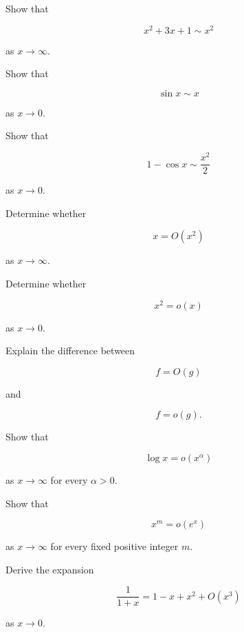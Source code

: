 \begin{exercise}[1]
Show that

\[
x^2+3x+1\sim x^2
\]

as \(x\to\infty\).
\end{exercise}

\begin{exercise}[1]
Show that

\[
\sin x\sim x
\]

as \(x\to0\).
\end{exercise}

\begin{exercise}[1]
Show that

\[
1-\cos x
\sim
\frac{x^2}{2}
\]

as \(x\to0\).
\end{exercise}

\begin{exercise}[1]
Determine whether

\[
x=O(x^2)
\]

as \(x\to\infty\).
\end{exercise}

\begin{exercise}[1]
Determine whether

\[
x^2=o(x)
\]

as \(x\to0\).
\end{exercise}

\begin{exercise}[1]
Explain the difference between

\[
f=O(g)
\]

and

\[
f=o(g).
\]
\end{exercise}

\begin{exercise}[2]
Show that

\[
\log x=o(x^\alpha)
\]

as \(x\to\infty\) for every \(\alpha>0\).
\end{exercise}

\begin{exercise}[2]
Show that

\[
x^m=o(e^x)
\]

as \(x\to\infty\) for every fixed positive integer \(m\).
\end{exercise}

\begin{exercise}[2]
Derive the expansion

\[
\frac{1}{1+x}
=
1-x+x^2+O(x^3)
\]

as \(x\to0\).
\end{exercise}

